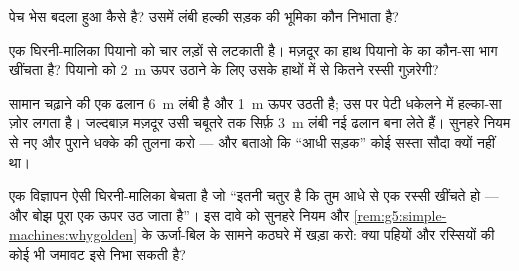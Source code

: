 \begin{exercise}[$\star$]\label{exo:g5:simple-machines:8}
पेच भेस बदला हुआ  कैसे है? उसमें लंबी हल्की सड़क की भूमिका कौन
निभाता है?
\end{exercise}

\begin{exercise}[$\star\star$]\label{exo:g5:simple-machines:9}
एक घिरनी-मालिका पियानो को चार लड़ों से लटकाती है। मज़दूर का हाथ
पियानो के  का कौन-सा भाग खींचता है? पियानो को \qty{2}{m} ऊपर
उठाने के लिए उसके हाथों में से कितने  रस्सी गुज़रेगी?
\end{exercise}

\begin{exercise}[$\star\star$]\label{exo:g5:simple-machines:10}
सामान चढ़ाने की एक ढलान \qty{6}{m} लंबी है और \qty{1}{m} ऊपर उठती
है; उस पर पेटी धकेलने में हल्का-सा ज़ोर लगता है। जल्दबाज़ मज़दूर उसी
चबूतरे तक सिर्फ़ \qty{3}{m} लंबी नई ढलान बना लेते हैं। सुनहरे नियम
से नए और पुराने धक्के की तुलना करो --- और बताओ कि ``आधी सड़क'' कोई
सस्ता सौदा क्यों नहीं था।
\end{exercise}

\begin{exercise}[$\star\star$]\label{exo:g5:simple-machines:11}
एक विज्ञापन ऐसी घिरनी-मालिका बेचता है जो ``इतनी चतुर है कि तुम आधे
 से एक  रस्सी खींचते हो --- और बोझ पूरा एक  ऊपर उठ जाता
है''। इस दावे को सुनहरे नियम और
\cref{rem:g5:simple-machines:whygolden} के ऊर्जा-बिल के सामने कठघरे
में खड़ा करो: क्या पहियों और रस्सियों की कोई भी जमावट इसे निभा सकती
है?
\end{exercise}
